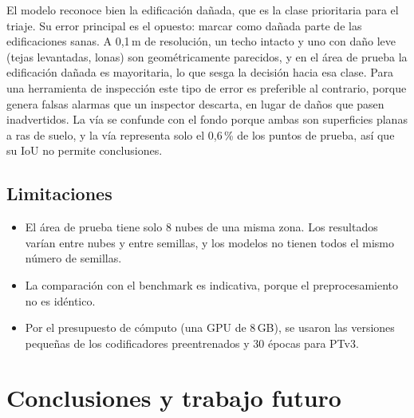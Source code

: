 \documentclass[5p]{elsarticle}
\begin{document}
El modelo reconoce bien la edificación dañada, que es la clase prioritaria para el triaje. Su error principal es el opuesto: marcar como dañada parte de las edificaciones sanas. A 0,1\,m de resolución, un techo intacto y uno con daño leve (tejas levantadas, lonas) son geométricamente parecidos, y en el área de prueba la edificación dañada es mayoritaria, lo que sesga la decisión hacia esa clase. Para una herramienta de inspección este tipo de error es preferible al contrario, porque genera falsas alarmas que un inspector descarta, en lugar de daños que pasen inadvertidos. La vía se confunde con el fondo porque ambas son superficies planas a ras de suelo, y la vía representa solo el 0,6\,\% de los puntos de prueba, así que su IoU no permite conclusiones.

\subsection{Limitaciones}

\begin{itemize}
    \item El área de prueba tiene solo 8 nubes de una misma zona. Los resultados varían entre nubes y entre semillas, y los modelos no tienen todos el mismo número de semillas.
    \item La comparación con el benchmark es indicativa, porque el preprocesamiento no es idéntico.
    \item Por el presupuesto de cómputo (una GPU de 8\,GB), se usaron las versiones pequeñas de los codificadores preentrenados y 30 épocas para PTv3.
\end{itemize}


\section{Conclusiones y trabajo futuro}\label{sec:conclusiones}
\end{document}
